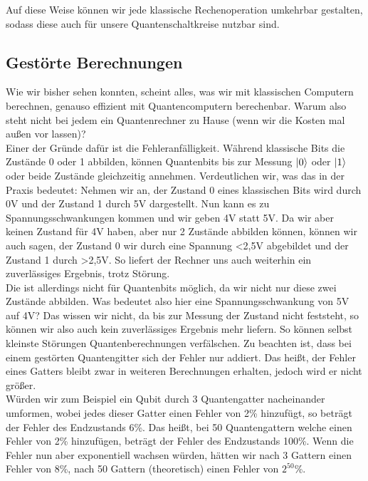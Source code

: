 Auf diese Weise können wir jede klassische Rechenoperation umkehrbar gestalten, sodass diese auch für unsere Quantenschaltkreise nutzbar sind.\\


\subsection{Gestörte Berechnungen}
\label{subsec:gestoerte-berechnungen}

Wie wir bisher sehen konnten, scheint alles, was wir mit klassischen Computern berechnen, genauso effizient mit Quantencomputern berechenbar.
Warum also steht nicht bei jedem ein Quantenrechner zu Hause (wenn wir die Kosten mal außen vor lassen)?\\

Einer der Gründe dafür ist die Fehleranfälligkeit.
Während klassische Bits die Zustände 0 oder 1 abbilden, können Quantenbits bis zur Messung $\ket{0}$ oder $\ket{1}$ oder beide Zustände gleichzeitig annehmen.
Verdeutlichen wir, was das in der Praxis bedeutet: Nehmen wir an, der Zustand 0 eines klassischen Bits wird durch 0V und der Zustand 1 durch 5V dargestellt.
Nun kann es zu Spannungsschwankungen kommen und wir geben 4V statt 5V\@.
Da wir aber keinen Zustand für 4V haben, aber nur 2 Zustände abbilden können, können wir auch sagen, der Zustand 0 wir durch eine Spannung <2,5V abgebildet und der Zustand 1 durch >2,5V.
So liefert der Rechner uns auch weiterhin ein zuverlässiges Ergebnis, trotz Störung.\\

Die ist allerdings nicht für Quantenbits möglich, da wir nicht nur diese zwei Zustände abbilden.
Was bedeutet also hier eine Spannungsschwankung von 5V auf 4V?
Das wissen wir nicht, da bis zur Messung der Zustand nicht feststeht, so können wir also auch kein zuverlässiges Ergebnis mehr liefern.
So können selbst kleinste Störungen Quantenberechnungen verfälschen.
Zu beachten ist, dass bei einem gestörten Quantengitter sich der Fehler nur addiert.
Das heißt, der Fehler eines Gatters bleibt zwar in weiteren Berechnungen erhalten, jedoch wird er nicht größer.\\

Würden wir zum Beispiel ein Qubit durch 3 Quantengatter nacheinander umformen, wobei jedes dieser Gatter einen Fehler von 2\% hinzufügt, so beträgt der Fehler des Endzustands 6\%.
Das heißt, bei 50 Quantengattern welche einen Fehler von 2\% hinzufügen, beträgt der Fehler des Endzustands 100\%.
Wenn die Fehler nun aber exponentiell wachsen würden, hätten wir nach 3 Gattern einen Fehler von 8\%, nach 50 Gattern (theoretisch) einen Fehler von $2^{50}$\%.\\

